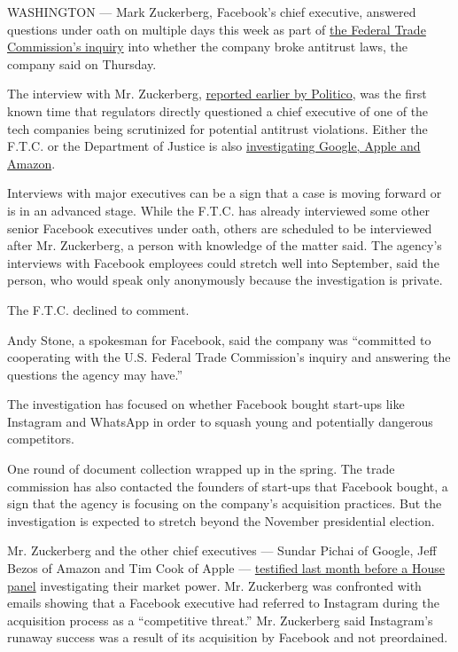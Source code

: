 WASHINGTON --- Mark Zuckerberg, Facebook's chief executive, answered
questions under oath on multiple days this week as part of
\href{https://www.nytimes3xbfgragh.onion/2020/07/17/technology/ftc-facebook-investigation.html}{the
Federal Trade Commission's inquiry} into whether the company broke
antitrust laws, the company said on Thursday.

The interview with Mr. Zuckerberg,
\href{https://www.politico.com/news/2020/08/20/facebook-ceo-interviewed-by-ftc-as-part-of-antitrust-probe-399492}{reported
earlier by Politico}, was the first known time that regulators directly
questioned a chief executive of one of the tech companies being
scrutinized for potential antitrust violations. Either the F.T.C. or the
Department of Justice is also
\href{https://www.nytimes3xbfgragh.onion/2019/09/08/technology/antitrust-amazon-apple-facebook-google.html}{investigating
Google, Apple and Amazon}.

Interviews with major executives can be a sign that a case is moving
forward or is in an advanced stage. While the F.T.C. has already
interviewed some other senior Facebook executives under oath, others are
scheduled to be interviewed after Mr. Zuckerberg, a person with
knowledge of the matter said. The agency's interviews with Facebook
employees could stretch well into September, said the person, who would
speak only anonymously because the investigation is private.

The F.T.C. declined to comment.

Andy Stone, a spokesman for Facebook, said the company was ``committed
to cooperating with the U.S. Federal Trade Commission's inquiry and
answering the questions the agency may have.''

The investigation has focused on whether Facebook bought start-ups like
Instagram and WhatsApp in order to squash young and potentially
dangerous competitors.

One round of document collection wrapped up in the spring. The trade
commission has also contacted the founders of start-ups that Facebook
bought, a sign that the agency is focusing on the company's acquisition
practices. But the investigation is expected to stretch beyond the
November presidential election.

Mr. Zuckerberg and the other chief executives --- Sundar Pichai of
Google, Jeff Bezos of Amazon and Tim Cook of Apple ---
\href{https://www.nytimes3xbfgragh.onion/2020/07/29/technology/big-tech-hearing-apple-amazon-facebook-google.html}{testified
last month before a House panel} investigating their market power. Mr.
Zuckerberg was confronted with emails showing that a Facebook executive
had referred to Instagram during the acquisition process as a
``competitive threat.'' Mr. Zuckerberg said Instagram's runaway success
was a result of its acquisition by Facebook and not preordained.

